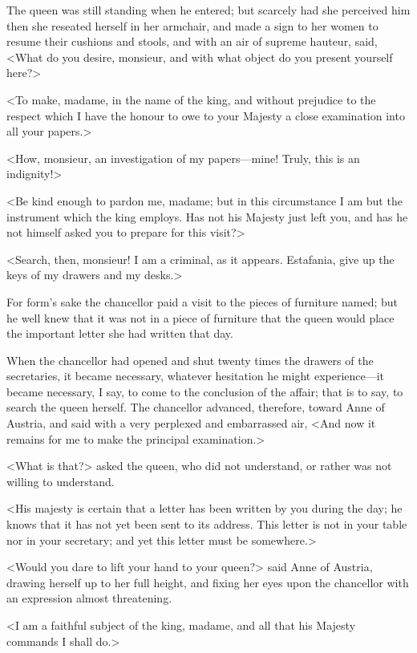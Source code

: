 The queen was still standing when he entered; but scarcely had she perceived him then she reseated herself in her armchair, and made a sign to her women to resume their cushions and stools, and with an air of supreme hauteur, said, <What do you desire, monsieur, and with what object do you present yourself here?> 

<To make, madame, in the name of the king, and without prejudice to the respect which I have the honour to owe to your Majesty a close examination into all your papers.> 

<How, monsieur, an investigation of my papers—mine! Truly, this is an indignity!> 

<Be kind enough to pardon me, madame; but in this circumstance I am but the instrument which the king employs. Has not his Majesty just left you, and has he not himself asked you to prepare for this visit?> 

<Search, then, monsieur! I am a criminal, as it appears. Estafania, give up the keys of my drawers and my desks.> 

For form's sake the chancellor paid a visit to the pieces of furniture named; but he well knew that it was not in a piece of furniture that the queen would place the important letter she had written that day. 

When the chancellor had opened and shut twenty times the drawers of the secretaries, it became necessary, whatever hesitation he might experience—it became necessary, I say, to come to the conclusion of the affair; that is to say, to search the queen herself. The chancellor advanced, therefore, toward Anne of Austria, and said with a very perplexed and embarrassed air, <And now it remains for me to make the principal examination.> 

<What is that?> asked the queen, who did not understand, or rather was not willing to understand. 

<His majesty is certain that a letter has been written by you during the day; he knows that it has not yet been sent to its address. This letter is not in your table nor in your secretary; and yet this letter must be somewhere.> 

<Would you dare to lift your hand to your queen?> said Anne of Austria, drawing herself up to her full height, and fixing her eyes upon the chancellor with an expression almost threatening. 

<I am a faithful subject of the king, madame, and all that his Majesty commands I shall do.> 

